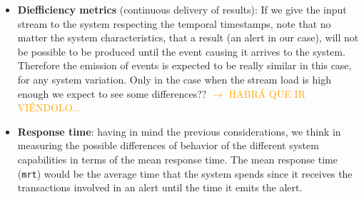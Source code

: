 \documentclass{article}
\begin{document}
\begin{itemize}
  \item \textbf{Diefficiency metrics} (continuous delivery of results): If we give the input stream to the system respecting the temporal timestamps, note that no matter the system characteristics, that a result (an alert in our case), will not be possible to be produced until the event causing it arrives to the system. Therefore the emission of events is expected to be really similar in this case, for any system variation. Only in the case when the stream load is high enough we expect to see some differences?? \textcolor{orange}{$\rightarrow$ HABRÁ QUE IR VIÉNDOLO...}
  \item \textbf{Response time}: having in mind the previous considerations, we think in measuring the possible differences of behavior of the different system capabilities in terms of the mean response time. The mean response time (\texttt{mrt}) would be the average time that the system spends since it receives the transactions involved in an alert until the time it emits the alert.
\end{itemize}
\end{document}
